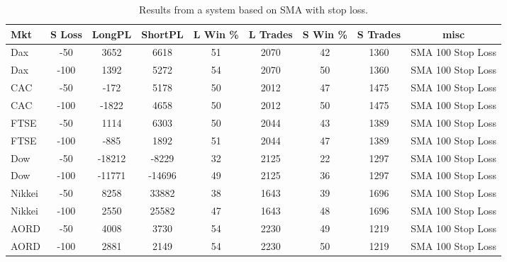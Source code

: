 \begin{table}[ht]
\centering
\caption[Results from a system based on SMA with stop loss]{Results from a system based on SMA with stop loss.} 
\label{tab:sma_results_Sloss}
\begin{tabular}{lcccccccc}
  \toprule Mkt & S Loss & LongPL & ShortPL & L Win \% & L Trades & S Win \% & S Trades & misc \\ 
  \midrule Dax & -50 & 3652 & 6618 & 51 & 2070 & 42 & 1360 & SMA 100 Stop Loss \\ 
  Dax & -100 & 1392 & 5272 & 54 & 2070 & 50 & 1360 & SMA 100 Stop Loss \\ 
  CAC & -50 & -172 & 5178 & 50 & 2012 & 47 & 1475 & SMA 100 Stop Loss \\ 
  CAC & -100 & -1822 & 4658 & 50 & 2012 & 50 & 1475 & SMA 100 Stop Loss \\ 
  FTSE & -50 & 1114 & 6303 & 50 & 2044 & 43 & 1389 & SMA 100 Stop Loss \\ 
  FTSE & -100 & -885 & 1892 & 51 & 2044 & 47 & 1389 & SMA 100 Stop Loss \\ 
  Dow & -50 & -18212 & -8229 & 32 & 2125 & 22 & 1297 & SMA 100 Stop Loss \\ 
  Dow & -100 & -11771 & -14696 & 49 & 2125 & 36 & 1297 & SMA 100 Stop Loss \\ 
  Nikkei & -50 & 8258 & 33882 & 38 & 1643 & 39 & 1696 & SMA 100 Stop Loss \\ 
  Nikkei & -100 & 2550 & 25582 & 47 & 1643 & 48 & 1696 & SMA 100 Stop Loss \\ 
  AORD & -50 & 4008 & 3730 & 54 & 2230 & 49 & 1219 & SMA 100 Stop Loss \\ 
  AORD & -100 & 2881 & 2149 & 54 & 2230 & 50 & 1219 & SMA 100 Stop Loss \\ 
   \bottomrule \end{tabular}
\end{table}
